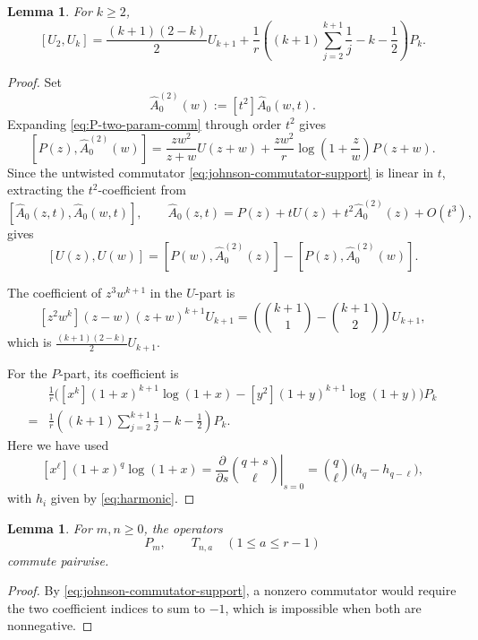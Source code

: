 \documentclass[letterpaper,12pt]{amsart}
\newtheorem{lem}[thm]{Lemma}
\theoremstyle{definition}
\numberwithin{equation}{section}
\begin{document}
\begin{lem}\label{lem:U2Uk}
For \(k\ge2\),
\[
  [U_2,U_k]
  =
  \frac{(k+1)(2-k)}2U_{k+1}
  +\frac1r\left(
    (k+1)\sum_{j=2}^{k+1}\frac1j-k-\frac12
  \right)P_k.
\]
\end{lem}
\begin{proof}
Set
\[
  \widehat A_0^{(2)}(w):=[t^2]\widehat A_0(w,t).
\]
Expanding \eqref{eq:P-two-param-comm} through order \(t^2\) gives
\begin{equation}\label{eq:P-A02-comm}
  [P(z),\widehat A_0^{(2)}(w)]
  =
  \frac{zw^2}{z+w}U(z+w)
  +\frac{zw^2}{r}\log\left(1+\frac zw\right)P(z+w).
\end{equation}
Since the untwisted commutator \eqref{eq:johnson-commutator-support} is linear in \(t\), extracting the
\(t^2\)-coefficient from
\[
  [\widehat A_0(z,t),\widehat A_0(w,t)],
  \qquad
  \widehat A_0(z,t)
  =
  P(z)+tU(z)+t^2\widehat A_0^{(2)}(z)+O(t^3),
\]
gives
\[
  [U(z),U(w)]
  =
  [P(w),\widehat A_0^{(2)}(z)]
  -
  [P(z),\widehat A_0^{(2)}(w)].
\]

The coefficient of \(z^3w^{k+1}\) in the \(U\)-part is
\[
  [z^2w^k](z-w)(z+w)^{k+1}U_{k+1}
  =
  \left(
    \binom{k+1}{1}-\binom{k+1}{2}
  \right)U_{k+1},
\]
which is \(\frac{(k+1)(2-k)}2U_{k+1}\).

For the \(P\)-part, its coefficient is
\begin{align*}
  &\frac1r\bigg(
    [x^k](1+x)^{k+1}\log(1+x)-[y^2](1+y)^{k+1}\log(1+y)\bigg)P_k\\
  = &\frac1r\left(
    (k+1)\sum_{j=2}^{k+1}\frac1j-k-\frac12
  \right)P_k.
\end{align*}
Here we have used
\[
  [x^\ell](1+x)^q\log(1+x)
  =
  \left.
    \frac{\partial}{\partial s}\binom{q+s}{\ell}
  \right|_{s=0}
  =
  \binom q\ell\bigl(h_q-h_{q-\ell}\bigr),
\]
with \(h_i\) given by \eqref{eq:harmonic}.
\end{proof}

\begin{lem}\label{lem:nonnegative-stationary-commute}
For \(m,n\geq0\), the operators
\[
  P_m,
  \qquad
  T_{n,a}\quad(1\leq a\leq r-1)
\]
commute pairwise.
\end{lem}
\begin{proof}
By \eqref{eq:johnson-commutator-support}, a nonzero commutator would
require the two coefficient indices to sum to \(-1\), which is impossible
when both are nonnegative.
\end{proof}
\end{document}
